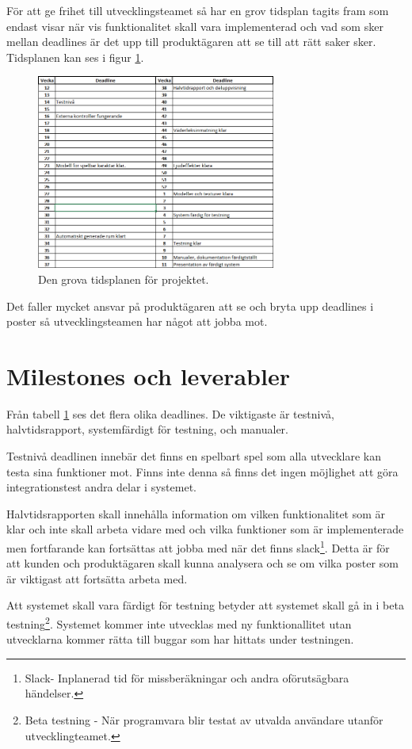 \documentclass[a4paper,12pt,oneside,final]{extbook}
\begin{document}
För att ge frihet till utvecklingsteamet så har en grov tidsplan tagits fram som endast visar när vis funktionalitet skall vara implementerad och vad som sker mellan deadlines är det upp till produktägaren att se till att rätt saker sker.  Tidsplanen kan ses i figur \ref{fig:tidsplan}.

\begin{figure}[H]
	\includegraphics[width=0.7\textwidth, center]{tidsplan.jpg}
	\caption{Den grova tidsplanen för projektet.}
	\label{fig:tidsplan}
\end{figure}
Det faller mycket ansvar på produktägaren att se och bryta upp deadlines i poster så utvecklingsteamen har något att jobba mot.


\section{Milestones och leverabler}
 Från tabell \ref{fig:tidsplan} ses det flera olika deadlines. De viktigaste är testnivå, halvtidsrapport, systemfärdigt för testning, och manualer.
 
 Testnivå deadlinen innebär det finns en spelbart spel som alla utvecklare kan testa sina funktioner mot. Finns inte denna så finns det ingen möjlighet att göra integrationstest andra delar i systemet.
 
 Halvtidsrapporten skall innehålla information om vilken funktionalitet som är klar och inte skall arbeta vidare med och vilka funktioner som är implementerade men fortfarande kan fortsättas att jobba med när det finns slack\footnote{Slack- Inplanerad tid för missberäkningar och andra oförutsägbara händelser.}. Detta är för att kunden och produktägaren skall kunna analysera och se om vilka poster som är viktigast att fortsätta arbeta med.
 
 Att systemet skall vara färdigt för testning betyder att systemet skall gå in i beta testning\footnote{Beta testning - När programvara blir testat av utvalda användare utanför utvecklingteamet.}. Systemet kommer inte utvecklas med ny funktionallitet utan utvecklarna kommer rätta till buggar som har hittats under testningen. 
 
\end{document}
